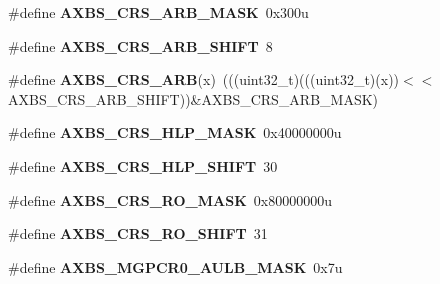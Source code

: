 \begin{DoxyCompactItemize}
\item 
\#define {\bfseries A\+X\+B\+S\+\_\+\+C\+R\+S\+\_\+\+A\+R\+B\+\_\+\+M\+A\+SK}~0x300u\hypertarget{group__AXBS__Register__Masks_ga18bef8f761d00bf46b543a96adb7eae3}{}\label{group__AXBS__Register__Masks_ga18bef8f761d00bf46b543a96adb7eae3}

\item 
\#define {\bfseries A\+X\+B\+S\+\_\+\+C\+R\+S\+\_\+\+A\+R\+B\+\_\+\+S\+H\+I\+FT}~8\hypertarget{group__AXBS__Register__Masks_ga1b37d1aff0c53735798f6de4ead2cf16}{}\label{group__AXBS__Register__Masks_ga1b37d1aff0c53735798f6de4ead2cf16}

\item 
\#define {\bfseries A\+X\+B\+S\+\_\+\+C\+R\+S\+\_\+\+A\+RB}(x)~(((uint32\+\_\+t)(((uint32\+\_\+t)(x))$<$$<$A\+X\+B\+S\+\_\+\+C\+R\+S\+\_\+\+A\+R\+B\+\_\+\+S\+H\+I\+FT))\&A\+X\+B\+S\+\_\+\+C\+R\+S\+\_\+\+A\+R\+B\+\_\+\+M\+A\+SK)\hypertarget{group__AXBS__Register__Masks_ga2b01a1d5a44e1d72b164f55cfacdf01b}{}\label{group__AXBS__Register__Masks_ga2b01a1d5a44e1d72b164f55cfacdf01b}

\item 
\#define {\bfseries A\+X\+B\+S\+\_\+\+C\+R\+S\+\_\+\+H\+L\+P\+\_\+\+M\+A\+SK}~0x40000000u\hypertarget{group__AXBS__Register__Masks_gab93f8320945abd915c31020d4d147d33}{}\label{group__AXBS__Register__Masks_gab93f8320945abd915c31020d4d147d33}

\item 
\#define {\bfseries A\+X\+B\+S\+\_\+\+C\+R\+S\+\_\+\+H\+L\+P\+\_\+\+S\+H\+I\+FT}~30\hypertarget{group__AXBS__Register__Masks_ga6cf361c996f63fd5cc169c352971bcd2}{}\label{group__AXBS__Register__Masks_ga6cf361c996f63fd5cc169c352971bcd2}

\item 
\#define {\bfseries A\+X\+B\+S\+\_\+\+C\+R\+S\+\_\+\+R\+O\+\_\+\+M\+A\+SK}~0x80000000u\hypertarget{group__AXBS__Register__Masks_gac511a1f4f6590cd86da388390b2993b5}{}\label{group__AXBS__Register__Masks_gac511a1f4f6590cd86da388390b2993b5}

\item 
\#define {\bfseries A\+X\+B\+S\+\_\+\+C\+R\+S\+\_\+\+R\+O\+\_\+\+S\+H\+I\+FT}~31\hypertarget{group__AXBS__Register__Masks_ga51572e77d4fe6c519be097a8e6324331}{}\label{group__AXBS__Register__Masks_ga51572e77d4fe6c519be097a8e6324331}

\item 
\#define {\bfseries A\+X\+B\+S\+\_\+\+M\+G\+P\+C\+R0\+\_\+\+A\+U\+L\+B\+\_\+\+M\+A\+SK}~0x7u\hypertarget{group__AXBS__Register__Masks_ga161e38235a1d3154067e078e559202fd}{}\label{group__AXBS__Register__Masks_ga161e38235a1d3154067e078e559202fd}


\end{DoxyCompactItemize}
